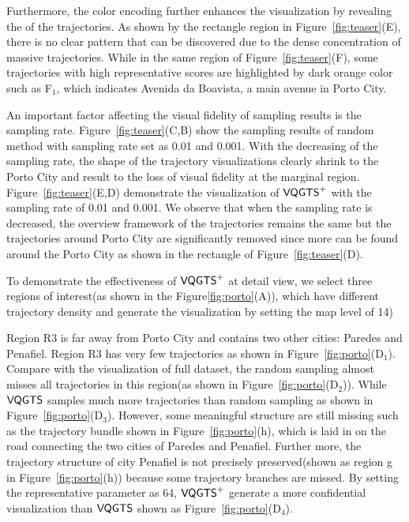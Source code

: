 Furthermore, the color encoding further enhances the visualization by revealing the  of the trajectories.
As shown by the rectangle region in Figure~\ref{fig:teaser}(E), there is no clear pattern that can be discovered due to the dense concentration of massive trajectories. While in the same region of Figure~\ref{fig:teaser}(F), some trajectories with high representative scores are highlighted by dark orange color such as F$_1$, which indicates Avenida da Boavista, a main avenue in Porto City. 
 
 
An important factor affecting the visual fidelity of sampling results is the sampling rate. Figure~\ref{fig:teaser}(C,B) show the sampling results of random method with sampling rate set as 0.01 and 0.001. With the decreasing of the sampling rate, the shape of the trajectory visualizations clearly shrink to the Porto City and result to the loss of visual fidelity at the marginal region. Figure~\ref{fig:teaser}(E,D) demonstrate the visualization of $\mathsf{VQGTS}^{+}$ with the sampling rate of 0.01 and 0.001. We observe that when the sampling rate is decreased, the overview framework of the trajectories remains the same but the trajectories around Porto City are significantly removed since more  can be found around the Porto City as shown in the rectangle of Figure~\ref{fig:teaser}(D). 

To demonstrate the effectiveness of $\mathsf{VQGTS}^{+}$ at detail view, we select three regions of interest(as shown in the Figure\ref{fig:porto}(A)), which have different trajectory density and generate the visualization by setting the map level of 14) 
   
Region R3 is far away from Porto City and contains two other cities: Paredes and Penafiel. Region R3 has very few trajectories as shown in Figure~\ref{fig:porto}(D$_1$).  Compare with the visualization of full dataset, the random sampling almost misses all trajectories in this region(as shown in Figure~\ref{fig:porto}(D$_2$)). While $\mathsf{VQGTS}$ samples much more trajectories than random sampling as shown in Figure~\ref{fig:porto}(D$_3$). However, some meaningful structure are still missing such as the trajectory bundle shown in Figure~\ref{fig:porto}(h), which is laid in on the road  connecting the two cities of Paredes and Penafiel. Further more, the trajectory structure of city Penafiel is not precisely preserved(shown as region g in Figure~\ref{fig:porto}(h)) because some  trajectory branches are missed.  
By setting the representative parameter as 64, $\mathsf{VQGTS}^{+}$ generate a more confidential visualization than $\mathsf{VQGTS}$ shown as Figure~\ref{fig:porto}(D$_4$). 

